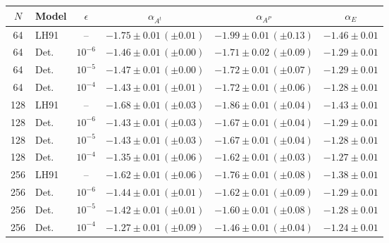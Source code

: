 \begin{tabular}{|c|l|c|c|c|c|}
\hline
\rowcolor[HTML]{C0C0C0}
$N$ & Model & $\epsilon$ & $\alpha_{A^{t}}$ & $\alpha_{A^{P}}$ & $\alpha_{E}$ \\ \hline
64 & LH91 & -- & $-1.75\pm0.01\,(\pm0.01)$ & $-1.99\pm0.01\,(\pm0.13)$ & $-1.46\pm0.01$ \\
64 & Det. & $10^{-6}$ & $-1.46\pm0.01\,(\pm0.00)$ & $-1.71\pm0.02\,(\pm0.09)$ & $-1.29\pm0.01$ \\
64 & Det. & $10^{-5}$ & $-1.47\pm0.01\,(\pm0.00)$ & $-1.72\pm0.01\,(\pm0.07)$ & $-1.29\pm0.01$ \\
64 & Det. & $10^{-4}$ & $-1.43\pm0.01\,(\pm0.01)$ & $-1.72\pm0.01\,(\pm0.06)$ & $-1.28\pm0.01$ \\
\hline
128 & LH91 & -- & $-1.68\pm0.01\,(\pm0.03)$ & $-1.86\pm0.01\,(\pm0.04)$ & $-1.43\pm0.01$ \\
128 & Det. & $10^{-6}$ & $-1.43\pm0.01\,(\pm0.03)$ & $-1.67\pm0.01\,(\pm0.04)$ & $-1.29\pm0.01$ \\
128 & Det. & $10^{-5}$ & $-1.43\pm0.01\,(\pm0.03)$ & $-1.67\pm0.01\,(\pm0.04)$ & $-1.28\pm0.01$ \\
128 & Det. & $10^{-4}$ & $-1.35\pm0.01\,(\pm0.06)$ & $-1.62\pm0.01\,(\pm0.03)$ & $-1.27\pm0.01$ \\
\hline
256 & LH91 & -- & $-1.62\pm0.01\,(\pm0.06)$ & $-1.76\pm0.01\,(\pm0.08)$ & $-1.38\pm0.01$ \\
256 & Det. & $10^{-6}$ & $-1.44\pm0.01\,(\pm0.01)$ & $-1.62\pm0.01\,(\pm0.09)$ & $-1.29\pm0.01$ \\
256 & Det. & $10^{-5}$ & $-1.42\pm0.01\,(\pm0.01)$ & $-1.60\pm0.01\,(\pm0.08)$ & $-1.28\pm0.01$ \\
256 & Det. & $10^{-4}$ & $-1.27\pm0.01\,(\pm0.09)$ & $-1.46\pm0.01\,(\pm0.04)$ & $-1.24\pm0.01$ \\
\hline
\end{tabular}
